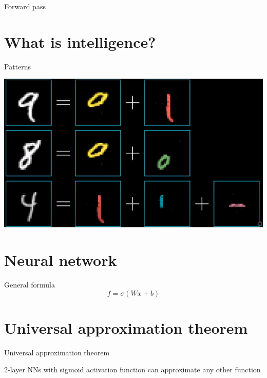\documentclass[aspectratio=169,xcolor=dvipsnames]{beamer}
\begin{document}
\begin{frame}{Forward pass}
    \begin{center}
    \end{center}
\end{frame}

\section{What is intelligence?}
\begin{frame}{Patterns}
    \begin{center}
        \includegraphics[width=\textheight]{../images/patterns.png}
    \end{center}
\end{frame}

\section{Neural network}
\begin{frame}{General formula}
    $$f = \sigma (Wx + b)$$
\end{frame}

\section{Universal approximation theorem}
\begin{frame}{Universal approximation theorem}
    \begin{theorem}
       2-layer NNs with sigmoid activation function can approximate any other function
    \end{theorem}
\end{frame}
\end{document}

